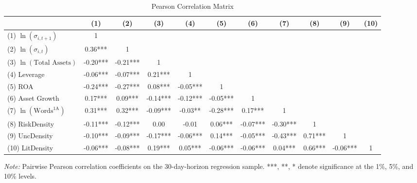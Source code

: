 \begin{table}[htbp]
\centering
\caption{Pearson Correlation Matrix}
\label{tab:correlation}
\scriptsize
\setlength{\tabcolsep}{0pt}
\begin{tabular*}{\textwidth}{@{\extracolsep{\fill}}lcccccccccc@{}}
\toprule
 & (1) & (2) & (3) & (4) & (5) & (6) & (7) & (8) & (9) & (10) \\
\midrule
(1) $\ln(\sigma_{i,t+1})$ & 1 &  &  &  &  &  &  &  &  &  \\
(2) $\ln(\sigma_{i,t})$ & 0.36*** & 1 &  &  &  &  &  &  &  &  \\
(3) $\ln(\text{Total Assets})$ & -0.20*** & -0.21*** & 1 &  &  &  &  &  &  &  \\
(4) Leverage & -0.06*** & -0.07*** & 0.21*** & 1 &  &  &  &  &  &  \\
(5) ROA & -0.24*** & -0.27*** & 0.08*** & -0.05*** & 1 &  &  &  &  &  \\
(6) Asset Growth & 0.17*** & 0.09*** & -0.14*** & -0.12*** & -0.05*** & 1 &  &  &  &  \\
(7) $\ln(\text{Words}^{\text{1A}})$ & 0.31*** & 0.32*** & -0.09*** & -0.03** & -0.28*** & 0.17*** & 1 &  &  &  \\
(8) RiskDensity & -0.11*** & -0.12*** & 0.00 & -0.01 & 0.06*** & -0.07*** & -0.30*** & 1 &  &  \\
(9) UncDensity & -0.10*** & -0.09*** & -0.17*** & -0.06*** & 0.14*** & -0.05*** & -0.43*** & 0.71*** & 1 &  \\
(10) LitDensity & -0.06*** & -0.08*** & 0.19*** & 0.05*** & -0.06*** & -0.06*** & 0.04*** & 0.66*** & -0.06*** & 1 \\
\bottomrule
\end{tabular*}
\par\smallskip
\begin{flushleft}\footnotesize 
\textit{Note:} Pairwise Pearson correlation coefficients on the 30-day-horizon regression sample. ***, **, * denote significance at the 1\%, 5\%, and 10\% levels.
\end{flushleft}
\end{table}